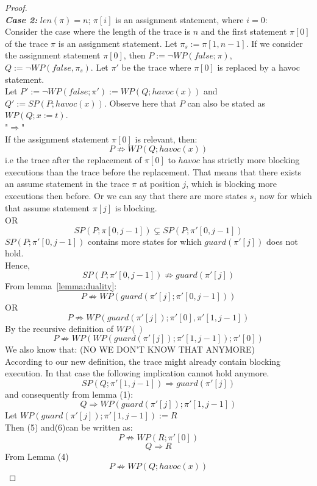 \documentclass{article}
\newcommand{\limp}{\Rightarrow}
\begin{document}
\begin{proof}
\\
\textit{\textbf{Case 2:}} $len(\pi)=n$; $\pi[i]$ is an assignment statement, where $i=0$: \\
Consider the case where the length of the trace is $n$ and the first statement $\pi[0]$ of the trace $\pi$ is an assignment statement. Let $\pi_s := \pi[1,n-1]$. If we consider the assignment statement $\pi[0]$, then $P:= \neg WP(false; \pi)$, $Q:= \neg WP(false, \pi_s)$. Let $\pi'$ be the trace where $\pi[0]$ is replaced by a havoc statement.\\
Let $P' := \neg WP(false; \pi') := WP(Q; havoc(x))$ and $Q' := SP(P; havoc(x))$. Observe here that $P$ can also be stated as $WP(Q; x:=t)$.\\
"$\Rightarrow$"\\
If the assignment statement $\pi[0]$ is relevant, then:
$$P \not \limp WP(Q; havoc(x))$$
i.e the trace after the replacement of $\pi[0]$ to $havoc$ has strictly more blocking executions than the trace before the replacement. That means that there exists an assume statement in the trace $\pi$ at position $j$, which is blocking more executions then before. Or we can say that there are more states $s_j$ now for which that assume statement $\pi[j]$ is blocking.\\
OR
$$SP(P; \pi[0,j-1]) \subsetneq SP(P; \pi'[0,j-1])$$
$SP(P; \pi'[0,j-1])$ contains more states for which $guard(\pi'[j])$ does not hold. \\
Hence,
$$SP(P; \pi'[0,j-1]) \not \limp guard(\pi'[j])$$
From lemma~\ref{lemma:duality}:
$$P \not \limp WP(guard(\pi'[j]; \pi'[0,j-1]))$$
OR
$$P \not\limp WP(guard(\pi'[j]);\pi'[0],\pi'[1,j-1])$$
By the recursive definition of $WP()$
\begin{equation} 
P \not\limp WP( WP(guard(\pi'[j]);\pi'[1,j-1]);\pi'[0])
\end{equation}
We also know that: (NO WE DON'T KNOW THAT ANYMORE)\\
According to our new definition, the trace might already contain blocking execution. In that case the following implication cannot hold anymore. 
$$SP(Q; \pi'[1,j-1]) \limp guard(\pi'[j])$$
and consequently from lemma (1):
\begin{equation} 
Q \limp WP(guard(\pi'[j]); \pi'[1,j-1])
\end{equation}
Let $WP(guard(\pi'[j]); \pi'[1,j-1]) := R$\\
Then (5) and(6)can be written as:
$$P \not\limp WP( R;\pi'[0])$$
$$Q \limp R$$
From Lemma (4)
\begin{equation} 
P \not\limp WP(Q; havoc(x))

\end{equation}
\end{proof}
\end{document}
